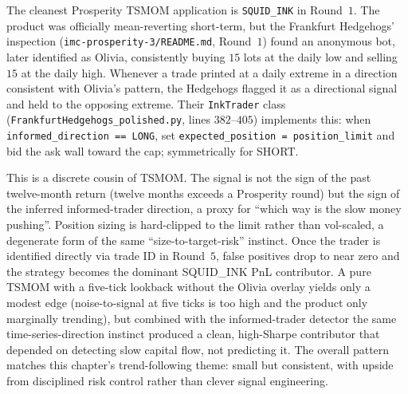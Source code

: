 \begin{prosperitybox}
\label{prosp:tsmom_squidink}
The cleanest Prosperity TSMOM application is \texttt{SQUID\_INK}
in Round~$1$. The product was officially mean-reverting
short-term, but the Frankfurt Hedgehogs'
inspection (\texttt{imc-prosperity-3/README.md}, Round~$1$) found
an anonymous bot, later identified as Olivia, consistently buying
$15$ lots at the daily low and selling $15$ at the daily high.
Whenever a trade printed at a daily extreme in a direction
consistent with Olivia's pattern, the Hedgehogs flagged it as a
directional signal and held to the opposing extreme. Their
\texttt{InkTrader} class
(\texttt{FrankfurtHedgehogs\_polished.py}, lines $382$--$405$)
implements this: when \texttt{informed\_direction == LONG}, set
\texttt{expected\_position = position\_limit} and bid the ask wall
toward the cap; symmetrically for SHORT.

This is a discrete cousin of TSMOM. The signal is not the sign of
the past twelve-month return (twelve months exceeds a Prosperity
round) but the sign of the inferred informed-trader direction, a
proxy for ``which way is the slow money pushing''. Position sizing is
hard-clipped to the limit rather than vol-scaled, a degenerate
form of the same ``size-to-target-risk'' instinct. Once the trader
is identified directly via trade ID in Round~$5$, false positives
drop to near zero and the strategy becomes the dominant
SQUID\_INK PnL contributor. A pure TSMOM with a five-tick lookback
without the Olivia overlay yields only a modest edge
(noise-to-signal at five ticks is too high and the product only
marginally trending), but combined with the informed-trader
detector the same time-series-direction instinct produced a
clean, high-Sharpe contributor that depended on detecting slow
capital flow, not predicting it. The overall pattern matches this
chapter's trend-following theme: small but consistent, with upside
from disciplined risk control rather than clever signal
engineering.
\end{prosperitybox}

